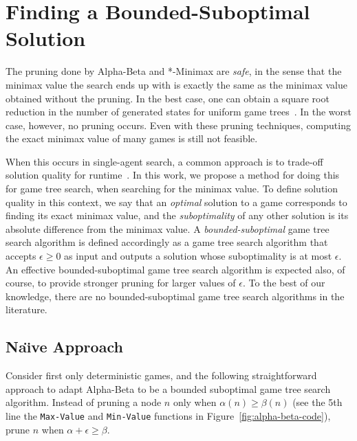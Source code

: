 \documentclass[runningheads]{llncs}
\begin{document}




\section{Finding a Bounded-Suboptimal Solution}

The pruning done by Alpha-Beta and *-Minimax are \emph{safe}, in the sense that the minimax value the search ends up with is exactly the same as the minimax value obtained without the pruning. In the best case, one can obtain a square root reduction in the number of generated states for uniform game trees~\citep{knuth1975analysis,ballard1983minimax}. In the worst case, however, no pruning occurs. Even with these pruning techniques, computing the exact minimax value of many games is still not feasible. %

When this occurs in single-agent search, a common approach is to trade-off solution quality for runtime~\citep{pohl1970heuristic,thayer2011bounded,gilon2016dynamic}. 
In this work, we propose a method for doing this for game tree search, when searching for the minimax value. 
To define solution quality in this context, we say that an  \emph{optimal} solution to a game corresponds to finding its exact minimax value, and the \emph{suboptimality} of any other solution is its absolute difference from the minimax value. %
A \emph{bounded-suboptimal} game tree search algorithm is defined accordingly as a game tree search algorithm that accepts $\epsilon\geq 0$ as input and outputs a solution whose suboptimality is at most $\epsilon$. 
An effective bounded-suboptimal game tree search algorithm is expected also, of course, to provide stronger pruning for larger values of $\epsilon$. To the best of our knowledge, there are no bounded-suboptimal game tree search algorithms in the literature. 

\subsection{Na\"{\i}ve Approach}
Consider first only deterministic games, and the following straightforward approach to adapt Alpha-Beta to be a bounded suboptimal  game tree search algorithm. Instead of pruning a node $n$ only when $\alpha(n)\geq \beta(n)$ (see the 5th line the {\tt Max-Value} and {\tt Min-Value} functions in Figure~\ref{fig:alpha-beta-code}), prune $n$  when $\alpha+\epsilon\geq \beta$. 
\end{document}
